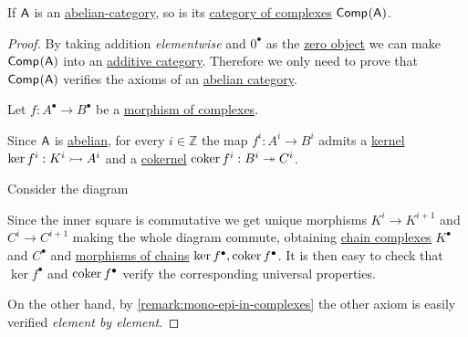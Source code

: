\documentclass[../../../main]{subfiles}
\begin{document}
\begin{theorem} \label{thm:complex-category-is-abelian}
  If \(\mathsf{A}\) is an \hyperref[def:abelian-category]{abelian-category}, so is its \hyperref[def:complex-category]{category of complexes} \(\mathsf{Comp}^{}(\mathsf{A})\).
\end{theorem}
\begin{proof}
  By taking addition \textit{elementwise} and \(0^{\bullet}\) as the \hyperref[def:zero-object]{zero object} we can make \(\mathsf{Comp}^{}(\mathsf{A})\) into an \hyperref[def:additive-category]{additive category}.
  Therefore we only need to prove that \(\mathsf{Comp}^{}(\mathsf{A})\) verifies the axioms of an \hyperref[def:abelian-category]{abelian category}.

  Let \(f: A^{\bullet} \to B^{\bullet}\) be a \hyperref[def:complex-morphism]{morphism of complexes}.

  Since \(\mathsf{A}\) is \hyperref[def:abelian-category]{abelian}, for every \(i \in \mathbb{Z}\) the map \(f^{i}: A^{i} \to B^{i}\) admits a \hyperref[def:categorical-kernel]{kernel} \(\ker f^{i}: K^{i} \rightarrowtail A^{i}\) and a \hyperref[def:categorical-cokernel]{cokernel} \(\operatorname*{coker} f^{i}: B^{i} \twoheadrightarrow C^{i}\).

  Consider the diagram
  \begin{center}
  \end{center}
  Since the inner square is commutative we get unique morphisms \(K^{i} \to K^{i+1}\) and \(C^{i} \to C^{i+1}\) making the whole diagram commute, obtaining \hyperref[def:complex]{chain complexes} \(K^{\bullet}\) and \(C^{\bullet}\) and \hyperref[def:complex-morphism]{morphisms of chains} \(\ker f^{\bullet}, \operatorname*{coker} f^{\bullet}\).
  It is then easy to check that \(\ker f^{\bullet}\) and \(\operatorname*{coker} f^{\bullet}\) verify the corresponding universal properties.

  On the other hand, by \autoref{remark:mono-epi-in-complexes} the other axiom is easily verified \textit{element by element}.
\end{proof}
\end{document}
